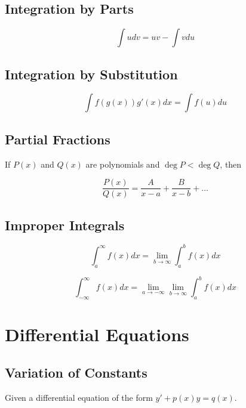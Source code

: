 \documentclass[12pt]{article}
\begin{document}
\subsection*{Integration by Parts}
\begin{equation}
  \int u dv = uv - \int v du
\end{equation}

\subsection*{Integration by Substitution}
\begin{equation}
  \int f(g(x)) g'(x) dx = \int f(u) du
\end{equation}

\subsection*{Partial Fractions}

If $P(x)$ and $Q(x)$ are polynomials and $\deg P < \deg Q$, then

\begin{equation}
  \frac{P(x)}{Q(x)} = \frac{A}{x-a} + \frac{B}{x-b} + \ldots
\end{equation}

\subsection*{Improper Integrals}

\begin{equation}
  \int_{a}^{\infty} f(x) dx = \lim_{b \to \infty} \int_{a}^{b} f(x) dx
\end{equation}

\begin{equation}
  \int_{-\infty}^{\infty} f(x) dx = \lim_{a \to -\infty} \lim_{b \to \infty} \int_{a}^{b} f(x) dx
\end{equation}

\section{Differential Equations}

\subsection*{Variation of Constants}

Given a differential equation of the form $y' + p(x)y = q(x)$.
\end{document}
